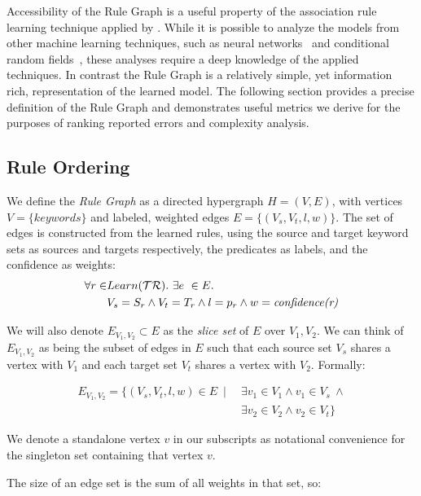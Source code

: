 Accessibility of the Rule Graph is a useful property of the association 
rule learning technique applied by \app.
While it is possible to analyze the models from other machine learning techniques, such as neural networks~\cite{lei2016rationalizing} and
conditional random fields~\cite{raychev2015predicting}, these analyses require a deep knowledge of the applied techniques.
In contrast the Rule Graph is a relatively simple, yet information rich, representation of the learned model.
The following section provides a precise definition of the Rule Graph
and demonstrates useful metrics we derive for the purposes of ranking reported errors
and complexity analysis.

\subsection{Rule Ordering}
\label{sec:ruleorder}

We define the \textit{Rule Graph} as a directed hypergraph $H = (V,E)$,
   with vertices $V = \{ keywords \}$ and labeled, weighted edges $E = \{ (V_s, V_t, l, w) \}$.
The set of edges is constructed from the learned rules, using the source and target keyword sets as sources and targets respectively, the predicates as labels, and the confidence as weights:
%
\begin{align*}
\forall r \in & Learn(\mathcal{TR}).\ \exists e\ \in E.\\
              & V_s = S_r \land V_t=T_r \land l=p_r \land w =
\textit{confidence(r)}
\end{align*}

We will also denote $E_{V_1, V_2} \subset E$ as the \textit{slice set} 
of $E$ over $V_1, V_2$.
We can think of $E_{V_1, V_2}$ as being the subset of edges in $E$ 
such that each source set $V_s$ shares a vertex with $V_1$
and each target set $V_t$ shares a vertex with $V_2$.
Formally: 

\begin{align*}
    E_{V_1, V_2} = \{ \left( V_s, V_t, l, w \right) \in E \ \mid \ & \exists v_1 \in V_1 \land v_1 \in V_s \ \land\\
    & \exists v_2 \in V_2 \land v_2 \in V_t \}
\end{align*}


We denote a standalone vertex $v$ in our subscripts as notational 
convenience for the singleton set containing that vertex $v$.

The size of an edge set is the sum of all weights in that set, so:

